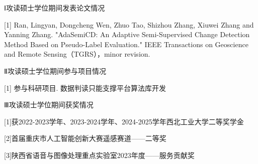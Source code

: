 \documentclass[lang=chs, degree=master, blindreview=false, adobe=false]{yanputhesis}
\begin{document}
\begin{accomplishments}                                     %
  Ⅰ攻读硕士学位期间发表论文情况

    [1] Ran, Lingyan, Dongcheng Wen, Zhuo Tao, Shizhou Zhang, Xiuwei Zhang and Yanning Zhang. "AdaSemiCD: An Adaptive Semi-Supervised Change Detection Method Based on Pseudo-Label Evaluation." IEEE Transactions on Geoscience and Remote Sensing（TGRS），minor revision.

  Ⅱ攻读硕士学位期间参与项目情况

    [1] 参与科研项目. 数据判读只能支撑平台算法库开发

  Ⅲ攻读硕士学位期间获奖情况

    [1]获2022-2023学年、2023-2024学年、2024-2025学年西北工业大学二等奖学金

    [2]首届重庆市人工智能创新大赛遥感赛道——二等奖

    [3]陕西省语音与图像处理重点实验室2023年度——服务贡献奖
\end{accomplishments}                                       %
\makestatement                                              %
\end{document}
